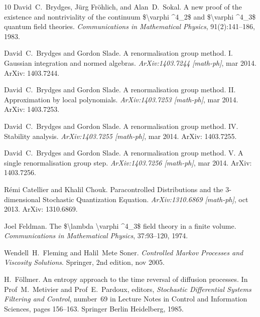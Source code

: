 \documentclass[11pt, oneside]{article}   	%
\newcommand{\tmtextit}[1]{{\itshape{#1}}}
\begin{document}
\begin{thebibliography}{10}
  David~C.~Brydges, J{\"u}rg Fr{\"o}hlich, and 
  Alan~D.~Sokal. {\newblock}A new proof of the existence and nontriviality of
  the continuum \$\textbackslash varphi {\textasciicircum}4\_2\$ and
  \$\textbackslash varphi {\textasciicircum}4\_3\$ quantum field theories.
  {\newblock}\tmtextit{Communications in Mathematical Physics},
  91(2):141--186, 1983.{\newblock}
  
  David~C.~Brydges  and  Gordon
  Slade. {\newblock}A renormalisation group method. I. Gaussian integration
  and normed algebras. {\newblock}\tmtextit{ArXiv:1403.7244 [math-ph]}, mar
  2014. {\newblock}ArXiv: 1403.7244.{\newblock}
  
  David~C.~Brydges  and  Gordon
  Slade. {\newblock}A renormalisation group method. II. Approximation by local
  polynomials. {\newblock}\tmtextit{ArXiv:1403.7253 [math-ph]}, mar 2014.
  {\newblock}ArXiv: 1403.7253.{\newblock}
  
  David~C.~Brydges  and  Gordon
  Slade. {\newblock}A renormalisation group method. IV. Stability analysis.
  {\newblock}\tmtextit{ArXiv:1403.7255 [math-ph]}, mar 2014. {\newblock}ArXiv:
  1403.7255.{\newblock}
  
  David~C.~Brydges  and  Gordon
  Slade. {\newblock}A renormalisation group method. V. A single
  renormalisation group step. {\newblock}\tmtextit{ArXiv:1403.7256 [math-ph]},
  mar 2014. {\newblock}ArXiv: 1403.7256.{\newblock}
  
  R{\'e}mi Catellier  and  Khalil
  Chouk. {\newblock}Paracontrolled Distributions and the 3-dimensional
  Stochastic Quantization Equation. {\newblock}\tmtextit{ArXiv:1310.6869
  [math-ph]}, oct 2013. {\newblock}ArXiv: 1310.6869.{\newblock}
  
  Joel Feldman. {\newblock}The
  \$\textbackslash lambda \textbackslash varphi {\textasciicircum}4\_3\$ field
  theory in a finite volume. {\newblock}\tmtextit{Communications in
  Mathematical Physics}, 37:93--120, 1974.{\newblock}
  
  Wendell~H.~Fleming  and  Halil~Mete
  Soner. {\newblock}\tmtextit{Controlled Markov Processes and Viscosity
  Solutions}. {\newblock}Springer, 2nd  edition, nov 2005.{\newblock}
  
  H.~F{\"o}llmer. {\newblock}An entropy
  approach to the time reversal of diffusion processes. {\newblock}In 
  Prof~M.~Metivier  and  Prof~E.~Pardoux, editors, \tmtextit{Stochastic
  Differential Systems Filtering and Control},  number~69  in  Lecture Notes
  in Control and Information Sciences,  pages  156--163. Springer Berlin
  Heidelberg, 1985.{\newblock}
  

\end{thebibliography}
\end{document}
